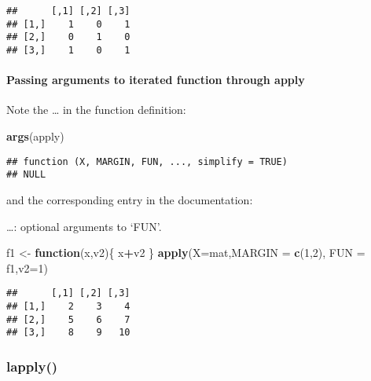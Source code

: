 \documentclass[
]{article}
\newenvironment{Shaded}{\begin{snugshade}}{\end{snugshade}}
\newcommand{\AttributeTok}[1]{\textcolor[rgb]{0.13,0.29,0.53}{#1}}
\newcommand{\ControlFlowTok}[1]{\textcolor[rgb]{0.13,0.29,0.53}{\textbf{#1}}}
\newcommand{\DecValTok}[1]{\textcolor[rgb]{0.00,0.00,0.81}{#1}}
\newcommand{\FunctionTok}[1]{\textcolor[rgb]{0.13,0.29,0.53}{\textbf{#1}}}
\newcommand{\NormalTok}[1]{#1}
\newcommand{\OtherTok}[1]{\textcolor[rgb]{0.56,0.35,0.01}{#1}}
\newcommand{\SpecialCharTok}[1]{\textcolor[rgb]{0.81,0.36,0.00}{\textbf{#1}}}
\begin{document}
\begin{verbatim}
##      [,1] [,2] [,3]
## [1,]    1    0    1
## [2,]    0    1    0
## [3,]    1    0    1
\end{verbatim}

\hypertarget{passing-arguments-to-iterated-function-through-apply}{%
\paragraph{Passing arguments to iterated function through
apply}\label{passing-arguments-to-iterated-function-through-apply}}

Note the \ldots{} in the function definition:

\begin{Shaded}
\begin{Highlighting}[]
\FunctionTok{args}\NormalTok{(apply)}
\end{Highlighting}
\end{Shaded}

\begin{verbatim}
## function (X, MARGIN, FUN, ..., simplify = TRUE) 
## NULL
\end{verbatim}

and the corresponding entry in the documentation:

\ldots: optional arguments to `FUN'.

\begin{Shaded}
\begin{Highlighting}[]
\NormalTok{f1 }\OtherTok{\textless{}{-}} \ControlFlowTok{function}\NormalTok{(x,v2)\{}
\NormalTok{  x}\SpecialCharTok{+}\NormalTok{v2}
\NormalTok{\}}
\FunctionTok{apply}\NormalTok{(}\AttributeTok{X=}\NormalTok{mat,}\AttributeTok{MARGIN =} \FunctionTok{c}\NormalTok{(}\DecValTok{1}\NormalTok{,}\DecValTok{2}\NormalTok{), }\AttributeTok{FUN =}\NormalTok{ f1,}\AttributeTok{v2=}\DecValTok{1}\NormalTok{)}
\end{Highlighting}
\end{Shaded}

\begin{verbatim}
##      [,1] [,2] [,3]
## [1,]    2    3    4
## [2,]    5    6    7
## [3,]    8    9   10
\end{verbatim}

\hypertarget{lapply}{%
\subsubsection{lapply()}\label{lapply}}
\end{document}
